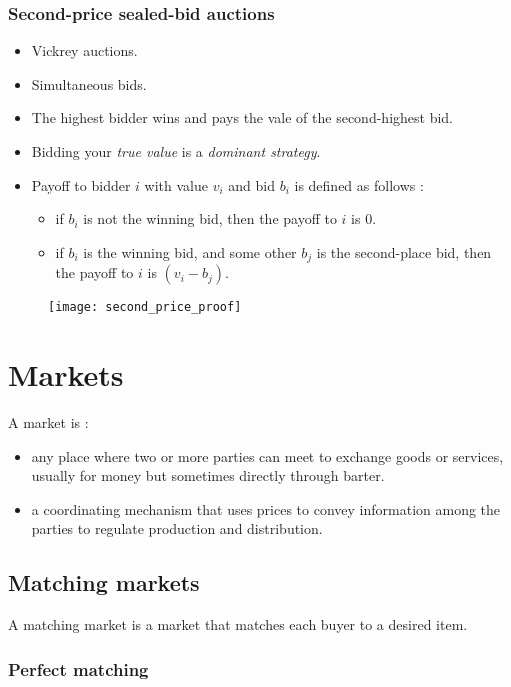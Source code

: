 \subsection{Second-price sealed-bid auctions}

\begin{itemize}
\item Vickrey auctions.
\item Simultaneous bids.
\item The highest bidder wins and pays the vale of the second-highest bid.
\item Bidding your \textit{true value} is a \textit{dominant strategy}.
\item Payoff to bidder $i$ with value $v_i$ and bid $b_i$ is defined as follows :
	\begin{itemize}
	\item if $b_i$ is not the winning bid, then the payoff to $i$ is $0$.
	\item if $b_i$ is the winning bid, and some other $b_j$ is the second-place bid, then the payoff to $i$ is $(v_i - b_j)$.
	\end{itemize}
\end{itemize}

\begin{figure}[H]
    \centering
    \texttt{[image: second\_price\_proof]}
\end{figure}

\chapter{Markets}

A market is :
\begin{itemize}
\item any place where two or more parties can meet to exchange goods or services, usually for money but sometimes directly through barter.
\item a coordinating mechanism that uses prices to convey information among the parties to regulate production and distribution.
\end{itemize}

\section{Matching markets}

A matching market is a market that matches each buyer to a desired item.

\subsection{Perfect matching}


